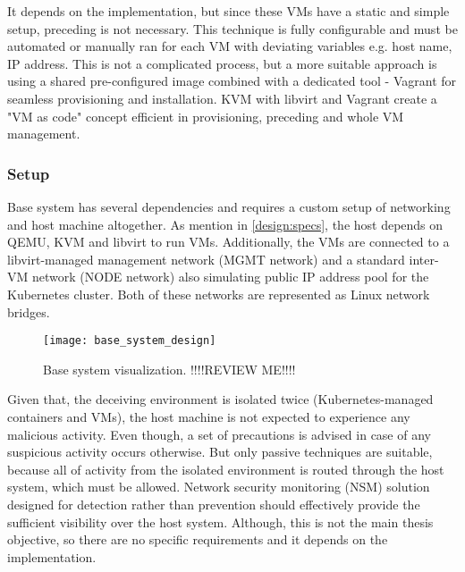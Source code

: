 It depends on the implementation, but since these VMs have a static and simple setup, preceding is not necessary. This technique is fully configurable and must be automated or manually ran for each VM with deviating variables e.g. host name, IP address. This is not a complicated process, but a more suitable approach is using a shared pre-configured image combined with a dedicated tool - Vagrant for seamless provisioning and installation. KVM with libvirt and Vagrant create a "VM as code" concept efficient in provisioning, preceding and whole VM management.


\subsubsection*{Setup \label{design:env-arch:base:setup}}
Base system has several dependencies and requires a custom setup of networking and host machine altogether. As mention in \autoref{design:specs}, the host depends on QEMU, KVM and libvirt to run VMs. Additionally, the VMs are connected to a libvirt-managed management network (MGMT network) and a standard inter-VM network (NODE network) also simulating public IP address pool for the Kubernetes cluster. Both of these networks are represented as Linux network bridges.

\begin{figure}[h]
	\centering
	\texttt{[image: base\_system\_design]}
	\caption{Base system visualization. !!!!REVIEW ME!!!!}
	\label{image:design:base_system}
\end{figure}

Given that, the deceiving environment is isolated twice (Kubernetes-managed containers and VMs), the host machine is not expected to experience any malicious activity. Even though, a set of precautions is advised in case of any suspicious activity occurs otherwise. But only passive techniques are suitable, because all of activity from the isolated environment is routed through the host system, which must be allowed. Network security monitoring (NSM) solution designed for detection rather than prevention should effectively provide the sufficient visibility over the host system. Although, this is not the main thesis objective, so there are no specific requirements and it depends on the implementation.

